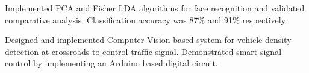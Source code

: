 \documentclass[]{deedy-resume-openfont}
\begin{document}
\begin{minipage}[t]{0.48\textwidth}
\sectionsep

Implemented PCA and Fisher LDA algorithms for face recognition and validated comparative analysis. Classification accuracy was 87\% and 91\%
respectively.
\sectionsep

 Designed and implemented Computer Vision based system for vehicle density detection at crossroads to control traffic signal. Demonstrated
smart signal control by implementing an Arduino
based digital circuit.
\sectionsep
%
%

\end{minipage}%
\hfill
\end{document}
